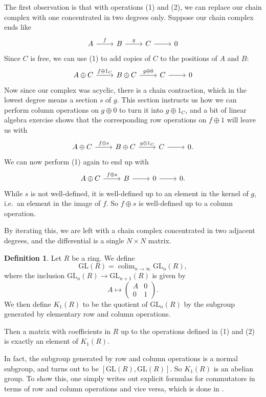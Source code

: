 \documentclass[a4paper, 12pt]{article}
\theoremstyle{definition}
\newtheorem{defi}[thm]{Definition}
\newcommand\GL{\mathrm{GL}}
\DeclareMathOperator*\colim{colim}
\begin{document}
The first observation is that with operations (1) and (2), we can replace our chain complex with one concentrated in two degrees only. Suppose our chain complex ends like
\[
  \begin{tikzcd}
    A \ar[r, "f"] & B \ar[r, "g"] & C \ar[r] & 0
  \end{tikzcd}
\]
Since $C$ is free, we can use (1) to add copies of $C$ to the positions of $A$ and $B$:
\[
  \begin{tikzcd}
    A \oplus C \ar[r, "f \oplus 1_C"] & B \oplus C \ar[r, "g\oplus 0"] & C \ar[r] & 0
  \end{tikzcd}
\]
Now since our complex was acyclic, there is a chain contraction, which in the lowest degree means a section $s$ of $g$. This section instructs us how we can perform column operations on $g \oplus 0$ to turn it into $g \oplus 1_C$, and a bit of linear algebra exercise shows that the corresponding row operations on $f \oplus 1$ will leave us with
\[
  \begin{tikzcd}
    A \oplus C \ar[r, "f \oplus s"] & B \oplus C \ar[r, "g\oplus 1_C"] & C \ar[r] & 0.
  \end{tikzcd}
\]
We can now perform (1) again to end up with
\[
  \begin{tikzcd}
    A \oplus C \ar[r, "f \oplus s"] & B \ar[r] & 0 \ar[r] & 0.
  \end{tikzcd}
\]
While $s$ is not well-defined, it is well-defined up to an element in the kernel of $g$, i.e.\ an element in the image of $f$. So $f \oplus s$ is well-defined up to a column operation.

By iterating this, we are left with a chain complex concentrated in two adjacent degrees, and the differential is a single $N \times N$ matrix.
\begin{defi}
  Let $R$ be a ring. We define
  \[
    \GL(R) = \colim_{n \to \infty} \GL_n(R),
  \]
  where the inclusion $\GL_n(R) \to \GL_{n + 1}(R)$ is given by
  \[
    A \mapsto 
    \begin{pmatrix}
      A & 0\\
      0 & 1
    \end{pmatrix}.
  \]
  We then define $K_1(R)$ to be the quotient of $\GL_n(R)$ by the subgroup generated by elementary row and column operations.
\end{defi}
Then a matrix with coefficients in $R$ up to the operations defined in (1) and (2) is exactly an element of $K_1(R)$.

In fact, the subgroup generated by row and column operations is a normal subgroup, and turns out to be $[\GL(R), \GL(R)]$. So $K_1(R)$ is an abelian group. To show this, one simply writes out explicit formulas for commutators in terms of row and column operations and vice versa, which is done in \cite{milnor-whitehead-torsion}.
\end{document}
